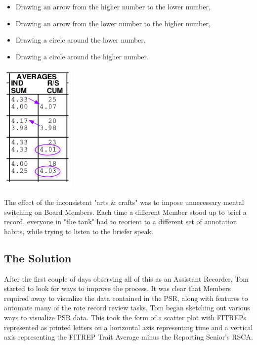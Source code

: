 \documentclass[UTF8]{article}
\begin{document}
\begin{minipage}{0.7\linewidth}
\begin{itemize}
  \item Drawing an arrow from the higher number to the lower number,
  \item Drawing an arrow from the lower number to the higher number,
  \item Drawing a circle around the lower number,
  \item Drawing a circle around the higher number.
\end{itemize}
\end{minipage}
\hfill
\begin{minipage}{0.3\linewidth}
  \includegraphics[width=0.4\linewidth]{inconsisent_annotations.png}\\
\end{minipage}



The effect of the inconsistent "arts \& crafts" was to impose unnecessary mental 
switching on Board Members. Each time a different Member stood up to brief a record,
everyone in "the tank" had to reorient to a different set of annotation habits,
while trying to listen to the briefer speak. \\

\subsection{The Solution}

After the first couple of days observing all of this as an Assistant Recorder, 
Tom started to look for ways to improve the process. It was clear that Members 
required away to visualize the data contained in the PSR, along with features 
to automate many of the rote record review tasks. Tom began sketching out 
various ways to visualize PSR data. This took the form of a scatter plot with
FITREPs represented as printed letters on a horizontal axis representing time
and a vertical axis representing the FITREP Trait Average minus the Reporting 
Senior's RSCA. \\
\end{document}
